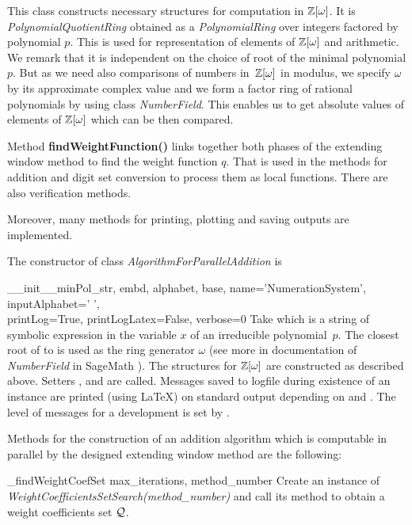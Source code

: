 This class constructs necessary structures for computation in $\mathbb{Z}[\omega]$. It is \emph{PolynomialQuotientRing} obtained as a \emph{PolynomialRing} over integers factored by polynomial $p$. This is used for representation of elements of $\mathbb{Z}[\omega]$ and arithmetic. We remark that it is independent on the choice of root of the  minimal polynomial $p$. But as we need also comparisons of numbers in~$\mathbb{Z}[\omega]$ in modulus, we specify $\omega$ by its approximate complex value and we form a factor ring of rational polynomials by using class \emph{NumberField}. This enables us to get absolute values of elements of $\mathbb{Z}[\omega]$ which can be then compared.

Method \textbf{findWeightFunction()} links together both phases of the extending window method to find the weight function $q$. That is used in the methods for addition and digit set conversion to process them as local functions. There are also verification methods.

Moreover, many methods for printing, plotting and saving outputs are implemented.

The constructor of class \emph{AlgorithmForParallelAddition} is 

\begin{method}{\_\_init\_\_}{minPol\_str, embd, alphabet, base, name='NumerationSystem', inputAlphabet=' ',\\
 printLog=True, printLogLatex=False, verbose=0}
Take  which is a string of symbolic expression in the variable $x$ of an irreducible polynomial~$p$. The closest root of   to  is used as the ring generator $\omega$ (see more in documentation of \emph{NumberField} in SageMath \cite{sage}). The structures for $\mathbb{Z}[\omega]$ are constructed as described above. Setters ,  and  are called.  Messages saved to logfile during existence of an instance are printed (using \LaTeX) on standard output depending on  and . The level of messages for a development is set by . 
\end{method}

Methods for the construction of an addition algorithm which is computable in parallel by the designed extending window method are the following:

\begin{method}{\_findWeightCoefSet}{ max\_iterations, method\_number}
Create an instance of \emph{WeightCoefficientsSetSearch(method\_number)} and call its method  to obtain a weight coefficients set $\mathcal{Q}$.
\end{method}

